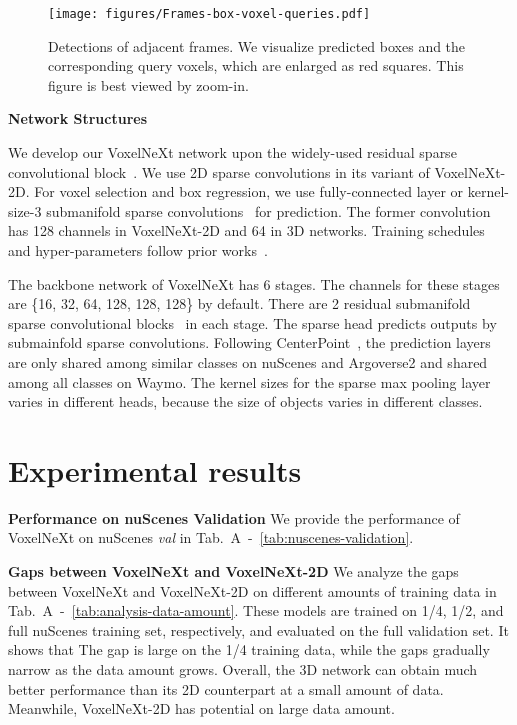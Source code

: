 \documentclass[10pt,twocolumn,letterpaper]{article}
\begin{document}
{\begin{figure*}[t]
\begin{center}
   \texttt{[image: figures/Frames-box-voxel-queries.pdf]}
   \caption{Detections of adjacent frames. We visualize predicted boxes and the corresponding query voxels, which are enlarged as red squares. This figure is best viewed by zoom-in.}
   \label{fig:frames-box-query-voxels}
\end{center}
\end{figure*}

\vspace{0.5em}
\noindent
\textbf{Network Structures}

We develop our VoxelNeXt network upon the widely-used residual sparse convolutional block~\cite{centerpoint,pvrcnn,voxel-rcnn}. We use 2D sparse convolutions in its variant of VoxelNeXt-2D. For voxel selection and box regression, we use fully-connected layer or kernel-size-3 submanifold sparse convolutions~\cite{submanifold-sparse-conv-v2} for prediction. The former convolution has 128 channels in VoxelNeXt-2D and 64 in 3D networks. Training schedules and hyper-parameters follow prior works~\cite{pvrcnn,centerpoint}. 

The backbone network of  VoxelNeXt has 6 stages. The channels for these stages are \{16, 32, 64, 128, 128, 128\} by default. There are 2 residual submanifold sparse convolutional blocks~\cite{submanifold-sparse-conv-v2} in each stage. The sparse head predicts outputs by  submainfold sparse convolutions. Following CenterPoint~\cite{centerpoint}, the prediction layers are only shared among similar classes on nuScenes and Argoverse2 and shared among all classes on Waymo. The kernel sizes for the sparse max pooling layer varies in different heads, because the size of objects varies in different classes.


\section{Experimental results}
\label{sec:experiments-results}
\noindent
\textbf{Performance on nuScenes Validation}
We provide the performance of VoxelNeXt on nuScenes {\em val} in Tab.~A~-~\ref{tab:nuscenes-validation}.

\vspace{0.5em}
\noindent
\textbf{Gaps between VoxelNeXt and VoxelNeXt-2D}
We analyze the gaps between VoxelNeXt and VoxelNeXt-2D on different amounts of training data in Tab.~A~-~\ref{tab:analysis-data-amount}. These models are trained on 1/4, 1/2, and full nuScenes training set, respectively, and evaluated on the full validation set. It shows that The gap is large on the 1/4 training data, while the gaps gradually narrow as the data amount grows. Overall, the 3D network can obtain much better performance than its 2D counterpart at a small amount of data. Meanwhile, VoxelNeXt-2D has potential on large data amount.

}
\end{document}
